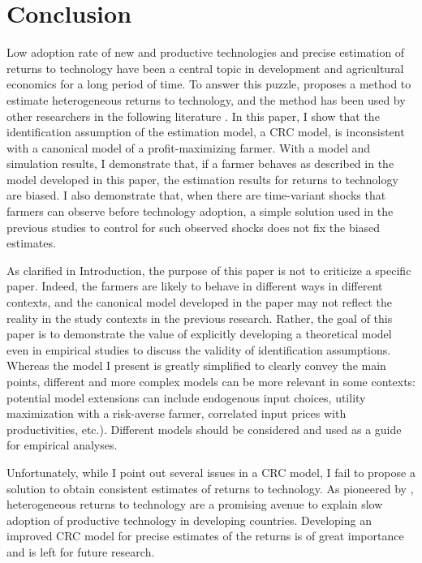 \documentclass[11pt,letterpaper]{article}
\begin{document}
\section{Conclusion}\label{sec:conclusion}

Low adoption rate of new and productive technologies and precise estimation of returns to technology have been a central topic in development and agricultural economics for a long period of time.
To answer this puzzle, \citet{Suri11} proposes a method to estimate heterogeneous returns to technology, and the method has been used by other researchers in the following literature \citep{Michler2019, wossen2019estimating}.
In this paper, I show that the identification assumption of the estimation model, a CRC model, is inconsistent with a canonical model of a profit-maximizing farmer.
With a model and simulation results, I demonstrate that, if a farmer behaves as described in the model developed in this paper, the estimation results for returns to technology are biased.
I also demonstrate that, when there are time-variant shocks that farmers can observe before technology adoption, a simple solution used in the previous studies to control for such observed shocks does not fix the biased estimates.

As clarified in Introduction, the purpose of this paper is not to criticize a specific paper.
Indeed, the farmers are likely to behave in different ways in different contexts, and the canonical model developed in the paper may not reflect the reality in the study contexts in the previous research.
Rather, the goal of this paper is to demonstrate the value of explicitly developing a theoretical model even in empirical studies to discuss the validity of identification assumptions.
Whereas the model I present is greatly simplified to clearly convey the main points, different and more complex models can be more relevant in some contexts: potential model extensions can include endogenous input choices, utility maximization with a risk-averse farmer, correlated input prices with productivities, etc.).
Different models should be considered and used as a guide for empirical analyses.

Unfortunately, while I point out several issues in a CRC model, I fail to propose a solution to obtain consistent estimates of returns to technology.
As pioneered by \citet{Suri11}, heterogeneous returns to technology are a promising avenue to explain slow adoption of productive technology in developing countries.
Developing an improved CRC model for precise estimates of the returns is of great importance and is left for future research.
\end{document}
